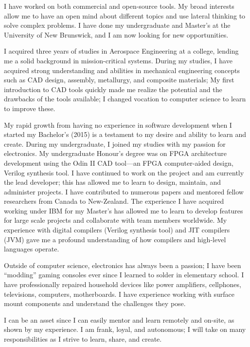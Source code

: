 I have worked on both commercial and open-source tools.
My broad interests allow me to have an open mind about different topics and use lateral thinking to solve complex problems.
I have done my undergraduate and Master's at the University of New Brunswick, and I am now looking for new opportunities.

I acquired three years of studies in Aerospace Engineering at a college, lending me a solid background in mission-critical systems.
During my studies, I have acquired strong understanding and abilities in mechanical engineering concepts such as CAD design, assembly, metallurgy, and composite materials;
My first introduction to CAD tools quickly made me realize the potential and the drawbacks of the tools available; I changed vocation to computer science to learn to improve these.

My rapid growth from having no experience in software development when I started my Bachelor's (2015) is a testament to my desire and ability to learn and create.
During my undergraduate, I joined my studies with my passion for electronics. My undergraduate Honour's degree was on FPGA architecture development using the Odin II CAD tool---an FPGA computer-aided design, Verilog synthesis tool.
I have continued to work on the project and am currently the lead developer; this has allowed me to learn to design, maintain, and administer projects.
I have contributed to numerous papers and mentored fellow researchers from Canada to New-Zealand.
The experience I have acquired working under IBM for my Master's has allowed me to learn to develop features for large scale projects and collaborate with team members worldwide.
My experience with digital compilers (Verilog synthesis tool) and JIT compilers (JVM) gave me a profound understanding of how compilers and high-level languages operate.

Outside of computer science, electronics has always been a passion; I have been ``modding'' gaming consoles ever since I learned to solder in elementary school.
I have professionally repaired household devices like power amplifiers, cellphones, televisions, computers, motherboards.
I have experience working with surface mount components and understand the challenges they pose.

I can be an asset since I can easily mentor and learn remotely and on-site, as shown by my experience.
I am frank, loyal, and autonomous; I will take on many responsibilities as I strive to learn, share, and create.
